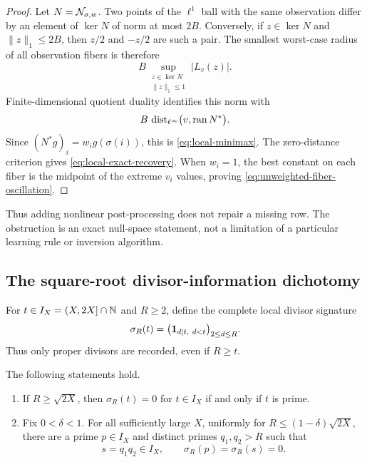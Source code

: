\begin{proof}
Let $N=\mathcal N_{\sigma,w}$.  Two points of the $\ell^1$ ball with the same
observation differ by an element of $\ker N$ of norm at most $2B$.
Conversely, if $z\in\ker N$ and $\|z\|_1\leq2B$, then $z/2$ and $-z/2$
are such a pair.  The smallest worst-case radius of all observation fibers
is therefore
\[
 B\sup_{\substack{z\in\ker N\\\|z\|_1\leq1}}|L_v(z)|.
\]
Finite-dimensional quotient duality identifies this norm with
\[
 B\,\operatorname{dist}_{\ell^\infty}
 \bigl(v,\operatorname{ran} N^*\bigr).
\]
Since $(N^*g)_i=w_i g(\sigma(i))$, this is
\eqref{eq:local-minimax}.  The zero-distance criterion gives
\eqref{eq:local-exact-recovery}.  When $w_i=1$, the best constant on each
fiber is the midpoint of the extreme $v_i$ values, proving
\eqref{eq:unweighted-fiber-oscillation}.
\end{proof}

Thus adding nonlinear post-processing does not repair a missing row.  The
obstruction is an exact null-space statement, not a limitation of a
particular learning rule or inversion algorithm.

\subsection{The square-root divisor-information dichotomy}

For $t\in I_X=(X,2X]\cap\mathbb N$ and $R\geq2$, define the complete local divisor
signature
\begin{equation}
 \sigma_R(t)=
 \bigl(\mathbf 1_{d\mid t,\ d<t}\bigr)_{2\leq d\leq R}.
 \label{eq:divisor-signature}
\end{equation}
Thus only proper divisors are recorded, even if $R\geq t$.

\begin{proposition}
\label{prop:square-root-information-gate}
The following statements hold.
\begin{enumerate}[label=\textup{(\roman*)}]
 \item If $R\geq\sqrt{2X}$, then $\sigma_R(t)=0$ for
 $t\in I_X$ if and only if $t$ is prime.
 \item Fix $0<\delta<1$.  For all sufficiently large $X$, uniformly for
 $R\leq(1-\delta)\sqrt{2X}$, there are a prime $p\in I_X$ and distinct
 primes $q_1,q_2>R$ such that
 \begin{equation}
  s=q_1q_2\in I_X,
  \qquad
  \sigma_R(p)=\sigma_R(s)=0.
  \label{eq:prime-semiprime-null-pair}
 \end{equation}
\end{enumerate}
\end{proposition}

